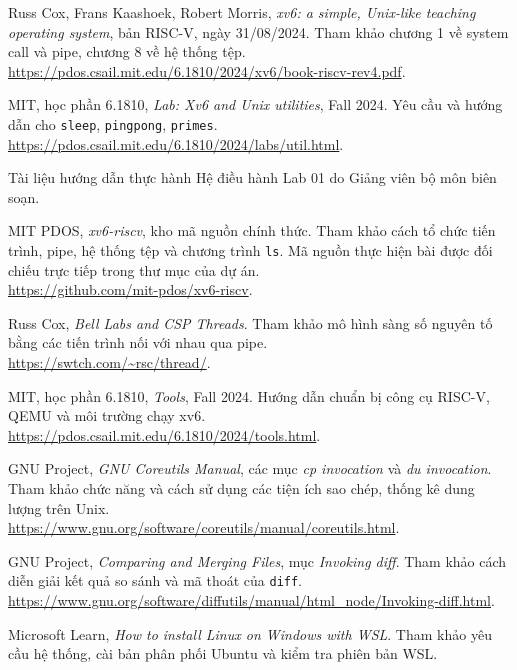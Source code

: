 \documentclass[12pt,a4paper]{article}
\begin{document}
\begingroup
\small
\raggedright
\begin{enumerate}[label={[\arabic*]},itemsep=0.6em]
  \item Russ Cox, Frans Kaashoek, Robert Morris, \textit{xv6: a simple, Unix-like teaching operating system}, bản RISC-V, ngày 31/08/2024. Tham khảo chương 1 về system call và pipe, chương 8 về hệ thống tệp.\\
  \url{https://pdos.csail.mit.edu/6.1810/2024/xv6/book-riscv-rev4.pdf}.
  \item MIT, học phần 6.1810, \textit{Lab: Xv6 and Unix utilities}, Fall 2024. Yêu cầu và hướng dẫn cho \texttt{sleep}, \texttt{pingpong}, \texttt{primes}.\\
  \url{https://pdos.csail.mit.edu/6.1810/2024/labs/util.html}.
  \item Tài liệu hướng dẫn thực hành Hệ điều hành Lab 01 do Giảng viên bộ môn biên soạn.
  \item MIT PDOS, \textit{xv6-riscv}, kho mã nguồn chính thức. Tham khảo cách tổ chức tiến trình, pipe, hệ thống tệp và chương trình \texttt{ls}. Mã nguồn thực hiện bài được đối chiếu trực tiếp trong thư mục  của dự án.\\
  \url{https://github.com/mit-pdos/xv6-riscv}.
  \item Russ Cox, \textit{Bell Labs and CSP Threads}. Tham khảo mô hình sàng số nguyên tố bằng các tiến trình nối với nhau qua pipe.\\
  \url{https://swtch.com/~rsc/thread/}.
  \item MIT, học phần 6.1810, \textit{Tools}, Fall 2024. Hướng dẫn chuẩn bị công cụ RISC-V, QEMU và môi trường chạy xv6.\\
  \url{https://pdos.csail.mit.edu/6.1810/2024/tools.html}.
  \item GNU Project, \textit{GNU Coreutils Manual}, các mục \textit{cp invocation} và \textit{du invocation}. Tham khảo chức năng và cách sử dụng các tiện ích sao chép, thống kê dung lượng trên Unix.\\
  \url{https://www.gnu.org/software/coreutils/manual/coreutils.html}.
  \item GNU Project, \textit{Comparing and Merging Files}, mục \textit{Invoking diff}. Tham khảo cách diễn giải kết quả so sánh và mã thoát của \texttt{diff}.\\
  \url{https://www.gnu.org/software/diffutils/manual/html_node/Invoking-diff.html}.
  \item Microsoft Learn, \textit{How to install Linux on Windows with WSL}. Tham khảo yêu cầu hệ thống, cài bản phân phối Ubuntu và kiểm tra phiên bản WSL.\\

\end{enumerate}
\end{document}
